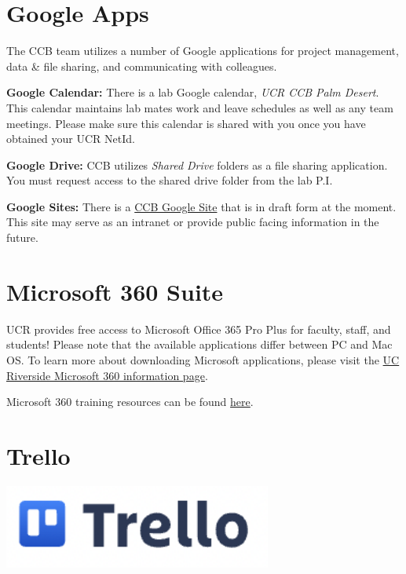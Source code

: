 \documentclass[
]{book}
\begin{document}
\hypertarget{google-apps}{%
\section{Google Apps}\label{google-apps}}

The CCB team utilizes a number of Google applications for project management, data \& file sharing, and communicating with colleagues.

\textbf{Google Calendar:} There is a lab Google calendar, \emph{UCR CCB Palm Desert}. This calendar maintains lab mates work and leave schedules as well as any team meetings. Please make sure this calendar is shared with you once you have obtained your UCR NetId.

\textbf{Google Drive:} CCB utilizes \emph{Shared Drive} folders as a file sharing application. You must request access to the shared drive folder from the lab P.I.

\textbf{Google Sites:} There is a \href{https://sites.google.com/ucr.edu/ccbucr/home}{CCB Google Site} that is in draft form at the moment. This site may serve as an intranet or provide public facing information in the future.

\hypertarget{microsoft-360-suite}{%
\section{Microsoft 360 Suite}\label{microsoft-360-suite}}

UCR provides free access to Microsoft Office 365 Pro Plus for faculty, staff, and students! Please note that the available applications differ between PC and Mac OS. To learn more about downloading Microsoft applications, please visit the
\href{https://ucrsupport.service-now.com/ucr_portal/?id=kb_article\&sys_id=0868da980f602f0086b7c7dce1050ee0}{UC Riverside Microsoft 360 information page}.

Microsoft 360 training resources can be found \href{https://support.microsoft.com/en-us/training}{here}.

\hypertarget{trello}{%
\section{Trello}\label{trello}}

\begin{flushleft}\includegraphics[width=3.47in]{images/trello} \end{flushleft}
\end{document}
